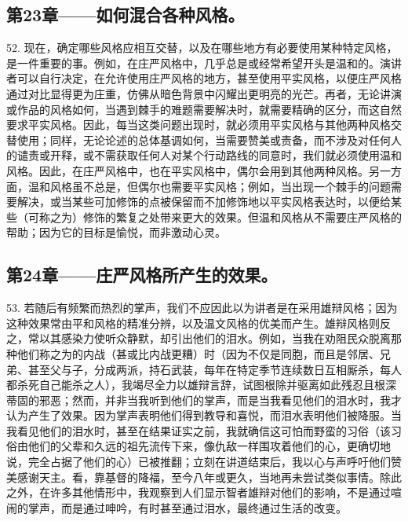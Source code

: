 \subsection{第23章——如何混合各种风格。}

52. 现在，确定哪些风格应相互交替，以及在哪些地方有必要使用某种特定风格，是一件重要的事。例如，在庄严风格中，几乎总是或经常希望开头是温和的。演讲者可以自行决定，在允许使用庄严风格的地方，甚至使用平实风格，以便庄严风格通过对比显得更为庄重，仿佛从暗色背景中闪耀出更明亮的光芒。再者，无论讲演或作品的风格如何，当遇到棘手的难题需要解决时，就需要精确的区分，而这自然要求平实风格。因此，每当这类问题出现时，就必须用平实风格与其他两种风格交替使用；同样，无论论述的总体基调如何，当需要赞美或责备，而不涉及对任何人的谴责或开释，或不需获取任何人对某个行动路线的同意时，我们就必须使用温和风格。因此，在庄严风格中，也在平实风格中，偶尔会用到其他两种风格。另一方面，温和风格虽不总是，但偶尔也需要平实风格；例如，当出现一个棘手的问题需要解决，或当某些可加修饰的点被保留而不加修饰地以平实风格表达时，以便给某些（可称之为）修饰的繁复之处带来更大的效果。但温和风格从不需要庄严风格的帮助；因为它的目标是愉悦，而非激动心灵。\par


\subsection{第24章——庄严风格所产生的效果。}

53. 若随后有频繁而热烈的掌声，我们不应因此以为讲者是在采用雄辩风格；因为这种效果常由平和风格的精准分辨，以及温文风格的优美而产生。雄辩风格则反之，常以其感染力使听众静默，却引出他们的泪水。例如，当我在劝阻民众脱离那种他们称之为的内战（甚或比内战更糟）时（因为不仅是同胞，而且是邻居、兄弟、甚至父与子，分成两派，持石武装，每年在特定季节连续数日互相厮杀，每人都杀死自己能杀之人），我竭尽全力以雄辩言辞，试图根除并驱离如此残忍且根深蒂固的邪恶；然而，并非当我听到他们的掌声，而是当我看见他们的泪水时，我才认为产生了效果。因为掌声表明他们得到教导和喜悦，而泪水表明他们被降服。当我看见他们的泪水时，甚至在结果证实之前，我就确信这可怕而野蛮的习俗（该习俗由他们的父辈和久远的祖先流传下来，像仇敌一样围攻着他们的心，更确切地说，完全占据了他们的心）已被推翻；立刻在讲道结束后，我以心与声呼吁他们赞美感谢天主。看，靠基督的降福，至今八年或更久，当地再未尝试类似事情。除此之外，在许多其他情形中，我观察到人们显示智者雄辩对他们的影响，不是通过喧闹的掌声，而是通过呻吟，有时甚至通过泪水，最终通过生活的改变。\par

